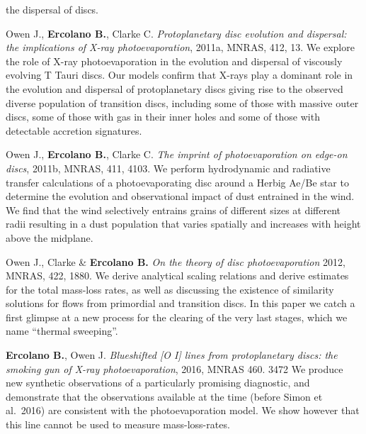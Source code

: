 \documentclass[10pt,fleqn,twoside]{article}
\begin{document}
\begin{literature}
the dispersal of discs. 
\item Owen J., \textbf{Ercolano B.}, Clarke C.  \textit{
  Protoplanetary disc evolution and dispersal: the implications of X-ray photoevaporation}, 2011a, MNRAS, 412, 13.
  We explore the role of X-ray photoevaporation in the evolution and
  dispersal of viscously evolving T Tauri discs. Our models confirm
  that X-rays play a dominant role in the evolution and dispersal of
  protoplanetary discs giving rise to the observed diverse population
  of transition discs, including some of those with massive outer
  discs, some of those
  with gas in their inner holes and some of those with detectable accretion
  signatures.  
\item Owen J., \textbf{Ercolano B.}, Clarke C.  \textit{
    The imprint of photoevaporation on edge-on discs}, 2011b, MNRAS, 411, 4103.
  We perform hydrodynamic and radiative transfer calculations of a
  photoevaporating disc around a Herbig Ae/Be star to determine the
  evolution and observational impact of dust entrained in the wind. We
  find that the wind selectively entrains grains of different sizes at
  different radii resulting in a dust population that varies spatially
  and increases with height above the midplane.
\item Owen J., Clarke \& \textbf{Ercolano B.}  \textit{On the theory of disc photoevaporation}
  2012, MNRAS, 422, 1880. We derive analytical scaling relations and
  derive estimates for the total mass-loss rates, as well as
  discussing the existence of similarity solutions for flows from
  primordial and transition discs. In this paper we catch a first
  glimpse at a new process for the clearing of the very last stages,
  which we name ``thermal sweeping''.
\item \textbf{Ercolano B.}, Owen J.  {\em Blueshifted [O I] lines from
    protoplanetary discs: the smoking gun of X-ray photoevaporation},
  2016, MNRAS 460. 3472
  We produce new synthetic observations of a particularly promising
  diagnostic, and demonstrate that the observations available at the
  time (before Simon et al.\ 2016) are consistent with the
  photoevaporation model. We show however that this line cannot be
  used to measure mass-loss-rates. 
\end{literature}


%
%
%
%
%
%
%
\end{document}
